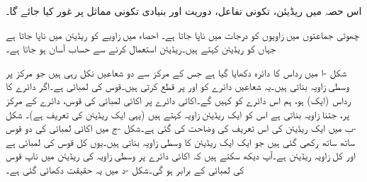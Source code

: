 اس حصہ میں ریڈیئن، تکونی تفاعل، دوریت اور بنیادی تکونی مماثل پر غور کیا جائے گا۔ 

چھوٹی جماعتوں میں زاویوں کو درجات  میں ناپا جاتا ہے۔ احصاء میں زاویے  کو ریڈیئن میں ناپا جاتا ہے جہاں  کو  ریڈیئن کہتے ہیں۔ریڈیئن  استعمال  کرنے سے حساب آسان ہو جاتا ہے۔

شکل -ا میں رداس  کا دائرہ دکھایا گیا ہے جس کے مرکز  سے دو شعاعیں نکل رہی ہیں جو مرکز پر وسطی زاویہ  بناتی ہیں۔یہ شعاعیں دائرے کو  اور  پر قطع کرتی ہیں۔قوس  کی لمبائی  ہے۔اگر دائرے کا رداس   (ایک) ہو،  ہم اس دائرے کو   کہیں گے۔اکائی دائرے پر اکائی لمبائی کی قوس، دائرے کے مرکز پر،  جتنا زاویہ بناتی ہے اس کو ایک ریڈیئن زاویہ کہتے ہیں (یہی ایک ریڈیئن کی تعریف ہے)۔ شکل -ب میں ایک ریڈیئن کی اس تعریف کی وضاحت کی گئی ہے۔شکل -ج میں اکائی لمبائی کی  دو قوس ساتھ ساتھ رکھی  گئی ہیں جو ایک ایک ریڈیئن کا وسطی زاویہ بناتی  ہیں۔یوں کل قوس کی لمبائی  ہے اور کل زاویہ  ریڈیئن ہے۔آپ دیکھ سکتے ہیں کہ اکائی دائرے پر وسطی زاویہ کی ریڈیئن میں ناپ قوس کی لمبائی کے برابر ہو گی۔شکل -د میں یہ  حقیقت دکھائی گئی ہے۔
